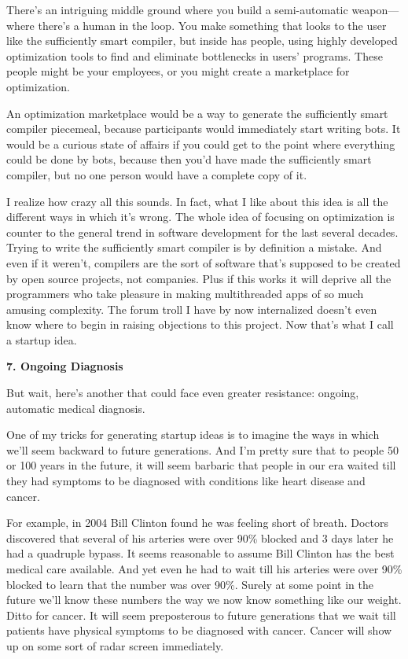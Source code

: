 \documentclass[12pt]{book}
\begin{document}
There's an intriguing middle ground where you build a semi-automatic
weapon---where there's a human in the loop. You make something that
looks to the user like the sufficiently smart compiler, but inside has
people, using highly developed optimization tools to find and eliminate
bottlenecks in users' programs. These people might be your employees, or
you might create a marketplace for optimization.

An optimization marketplace would be a way to generate the sufficiently
smart compiler piecemeal, because participants would immediately start
writing bots. It would be a curious state of affairs if you could get to
the point where everything could be done by bots, because then you'd
have made the sufficiently smart compiler, but no one person would have
a complete copy of it.

I realize how crazy all this sounds. In fact, what I like about this
idea is all the different ways in which it's wrong. The whole idea of
focusing on optimization is counter to the general trend in software
development for the last several decades. Trying to write the
sufficiently smart compiler is by definition a mistake. And even if it
weren't, compilers are the sort of software that's supposed to be
created by open source projects, not companies. Plus if this works it
will deprive all the programmers who take pleasure in making
multithreaded apps of so much amusing complexity. The forum troll I have
by now internalized doesn't even know where to begin in raising
objections to this project. Now that's what I call a startup idea.

\textbf{7. Ongoing Diagnosis}

But wait, here's another that could face even greater resistance:
ongoing, automatic medical diagnosis.

One of my tricks for generating startup ideas is to imagine the ways in
which we'll seem backward to future generations. And I'm pretty sure
that to people 50 or 100 years in the future, it will seem barbaric that
people in our era waited till they had symptoms to be diagnosed with
conditions like heart disease and cancer.

For example, in 2004 Bill Clinton found he was feeling short of breath.
Doctors discovered that several of his arteries were over 90\% blocked
and 3 days later he had a quadruple bypass. It seems reasonable to
assume Bill Clinton has the best medical care available. And yet even he
had to wait till his arteries were over 90\% blocked to learn that the
number was over 90\%. Surely at some point in the future we'll know
these numbers the way we now know something like our weight. Ditto for
cancer. It will seem preposterous to future generations that we wait
till patients have physical symptoms to be diagnosed with cancer. Cancer
will show up on some sort of radar screen immediately.
\end{document}
